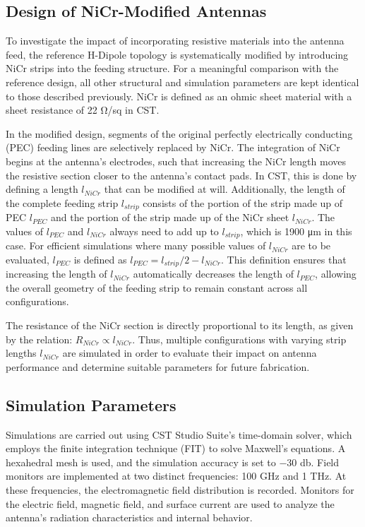 \subsection{Design of NiCr-Modified Antennas}

To investigate the impact of incorporating resistive materials into the antenna feed, the reference H-Dipole topology is systematically modified by introducing NiCr strips into the feeding structure. For a meaningful comparison with the reference design, all other structural and simulation parameters are kept identical to those described previously.
NiCr is defined as an ohmic sheet material with a sheet resistance of \num{22} \si{\ohm/sq} in CST.

In the modified design, segments of the original perfectly electrically conducting (PEC) feeding lines are selectively replaced by NiCr. The integration of NiCr begins at the antenna’s electrodes, such that increasing the NiCr length moves the resistive section closer to the antenna’s contact pads. In CST, this is done by defining a length $l_{NiCr}$ that can be modified at will. Additionally, the length of the complete feeding strip $l_{strip}$ consists of the portion of the strip made up of PEC $l_{PEC}$ and the portion of the strip made up of the NiCr sheet $l_{NiCr}$. The values of $l_{PEC}$ and $l_{NiCr}$ always need to add up to $l_{strip}$, which is \num{1900} \si{\micro\meter} in this case. For efficient simulations where many possible values of $l_{NiCr}$ are to be evaluated, $l_{PEC}$ is defined as $l_{PEC} = l_{strip}/2 - l_{NiCr}$. This definition ensures that increasing the length of $l_{NiCr}$ automatically decreases the length of $l_{PEC}$, allowing the overall geometry of the feeding strip to remain constant across all configurations.


The resistance of the NiCr section is directly proportional to its length, as given by the relation: $R_{NiCr} \propto l_{NiCr}$. Thus, multiple configurations with varying strip lengths $l_{NiCr}$ are simulated in order to evaluate their impact on antenna performance and determine suitable parameters for future fabrication.

\subsection{Simulation Parameters}

Simulations are carried out using CST Studio Suite’s time-domain solver, which employs the finite integration technique (FIT) to solve Maxwell’s equations. A hexahedral mesh is used, and the simulation accuracy is set to \num{-30} \si{\decibel}. Field monitors are implemented at two distinct frequencies: \num{100} \si{\giga\hertz} and \num{1} \si{\tera\hertz}. At these frequencies, the electromagnetic field distribution is recorded. Monitors for the electric field, magnetic field, and surface current are used to analyze the antenna's radiation characteristics and internal behavior.
